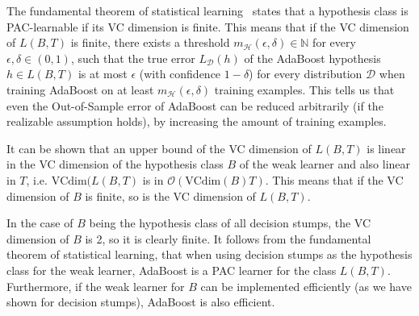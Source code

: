 The fundamental theorem of statistical learning~\cite[chapter 6]{SSBD14} states that a hypothesis class is PAC-learnable
if its VC dimension is finite.
This means that if the VC dimension of $L(B, T)$ is finite, there exists a threshold 
$m_\mathcal{H}(\epsilon, \delta) \in \mathbb{N}$ for every $\epsilon, \delta \in (0, 1)$, 
such that the true error $L_\mathcal{D}(h)$ of the AdaBoost hypothesis $h \in L(B, T)$ is at most $\epsilon$
(with confidence $1-\delta$)
for every distribution $\mathcal{D}$ when training AdaBoost on at least $m_\mathcal{H}(\epsilon, \delta)$ training
examples. This tells us that even the Out-of-Sample error of AdaBoost can be reduced arbitrarily (if the realizable
assumption holds), by increasing the amount of training examples.

It can be shown that an upper bound of the VC dimension of $L(B, T)$ is linear in the VC dimension of the hypothesis
class $B$ of the weak learner and also linear in $T$, i.e. $\text{VCdim}(L(B, T)$ is in
$\mathcal{O}(\text{VCdim}(B)T)$.
This means that if the VC dimension of $B$ is finite, so is the VC dimension of $L(B, T)$.

In the case of $B$ being the hypothesis class of all decision stumps, the VC dimension of $B$ is 2,
so it is clearly finite.
It follows from the fundamental theorem of statistical learning, that when using decision stumps as the hypothesis
class for the weak learner, AdaBoost is a PAC learner for the class $L(B, T)$.
Furthermore, if the weak learner for $B$ can be implemented efficiently (as we have shown for decision stumps), AdaBoost
is also efficient.
